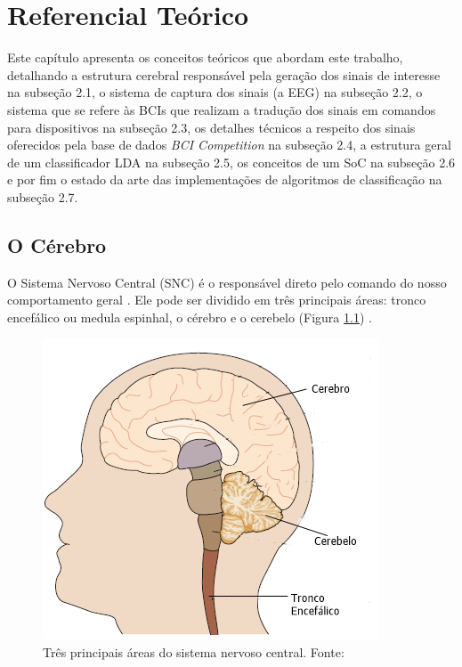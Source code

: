 
\chapter[Referencial Teórico]{Referencial Teórico}
Este capítulo apresenta os conceitos teóricos que abordam este trabalho, detalhando a estrutura cerebral responsável pela geração dos sinais de interesse na subseção 2.1, o sistema de captura dos sinais (a EEG) na subseção 2.2, o sistema que se refere às BCIs que realizam a tradução dos sinais em comandos para dispositivos na subseção 2.3, os detalhes técnicos a respeito dos sinais oferecidos pela base de dados \textit{BCI Competition} na subseção 2.4, a estrutura geral de um classificador LDA na subseção 2.5, os conceitos de um SoC na subseção 2.6 e por fim o estado da arte das implementações de algoritmos de classificação na subseção 2.7. 

\section{O Cérebro}
O Sistema Nervoso Central (SNC) é o responsável direto pelo comando do nosso comportamento geral \cite{David_Clarck}. Ele pode ser dividido em três principais áreas: tronco encefálico ou medula espinhal, o cérebro e o cerebelo (Figura \ref{BrainParts}) \cite{alvarezneurobiomecanismos}.

\begin{figure}[h]
	\centering
	\includegraphics[keepaspectratio=true,scale=1.0]{figuras/estrutura_cerebral.PNG}
	\caption{Três principais áreas do sistema nervoso central. Fonte: \cite{KANDEL}}
	\label{BrainParts}
\end{figure}

